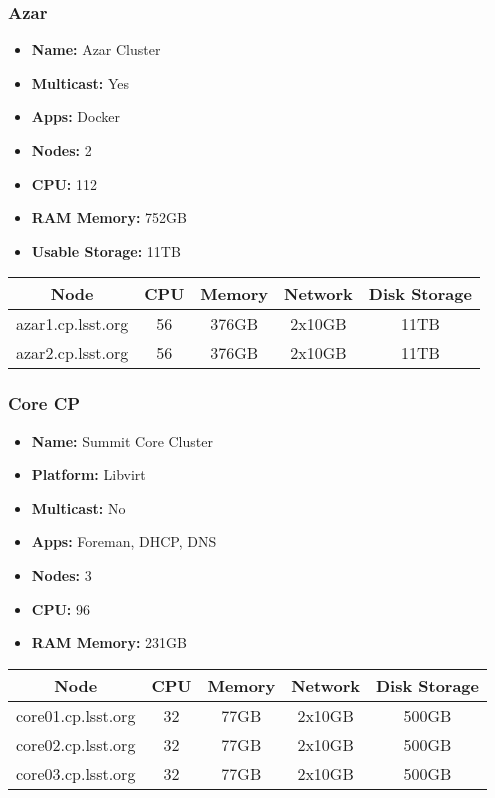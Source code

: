 \subsubsection{Azar}
\begin{itemize}
  \itemsep0em 
  \item \textbf{Name:}       Azar Cluster
  \item \textbf{Multicast:}  Yes
  \item \textbf{Apps:}       Docker
  \item \textbf{Nodes:}      2
  \item \textbf{CPU:}        112
  \item \textbf{RAM Memory:} 752GB
  \item \textbf{Usable Storage:}   11TB
\end{itemize}
\begin{center}
  \small
  \begin{tabular}{||c c c c c||}
    \hline
    \textbf{Node} & \textbf{CPU} & \textbf{Memory} & \textbf{Network} & \textbf{Disk Storage} \\ [0.5ex]
    \hline
    azar1.cp.lsst.org & 56 & 376GB & 2x10GB & 11TB \\
    \hline
    azar2.cp.lsst.org & 56 & 376GB & 2x10GB & 11TB \\
    \hline
  \end{tabular}
\end{center}

\newpage
\subsubsection{Core CP}
\begin{itemize}
  \itemsep0em 
  \item \textbf{Name:}       Summit Core Cluster
  \item \textbf{Platform:}   Libvirt
  \item \textbf{Multicast:}  No
  \item \textbf{Apps:}       Foreman, DHCP, DNS
  \item \textbf{Nodes:}      3
  \item \textbf{CPU:}        96
  \item \textbf{RAM Memory:} 231GB
\end{itemize}
\begin{center}
  \small
  \begin{tabular}{||c c c c c||}
    \hline
    \textbf{Node} & \textbf{CPU} & \textbf{Memory} & \textbf{Network} & \textbf{Disk Storage} \\ [0.5ex]
    \hline
    core01.cp.lsst.org & 32 & 77GB & 2x10GB & 500GB \\
    \hline
    core02.cp.lsst.org & 32 & 77GB & 2x10GB & 500GB \\
    \hline
    core03.cp.lsst.org & 32 & 77GB & 2x10GB & 500GB \\
    \hline
  \end{tabular}
\end{center}

